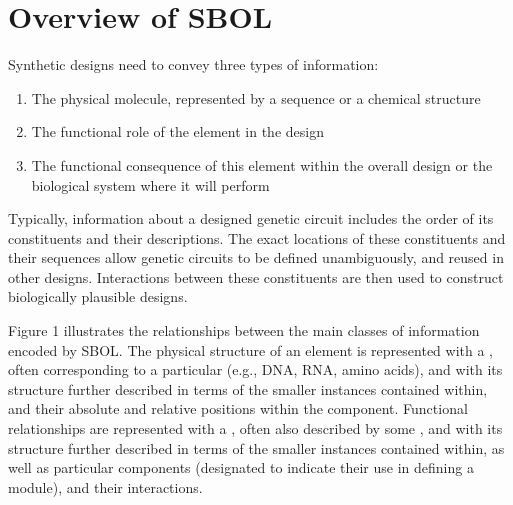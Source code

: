 \section{Overview of SBOL}
Synthetic designs need to convey three types of information:
\begin{enumerate}
\item The physical molecule, represented by a sequence or a chemical structure
\item The functional role of the element in the design
\item The functional consequence of this element within the overall design or the biological system where it will perform 
\end{enumerate}
Typically, information about a  designed genetic circuit includes the order of its constituents and their descriptions. The exact locations of these constituents and their sequences allow genetic circuits to be defined unambiguously, and reused in other designs. Interactions between these constituents are then used to construct biologically plausible designs. 

Figure 1 illustrates the relationships between the main classes of information encoded by SBOL.  
The physical structure of an element is represented with a , often corresponding to a particular  (e.g., DNA, RNA, amino acids), and with its structure further described in terms of the smaller  instances contained within, and their absolute and relative positions within the component.
Functional relationships are represented with a , often also described by some , and with its structure further described in terms of the smaller  instances contained within, as well as particular components (designated  to indicate their use in defining a module), and their interactions.



